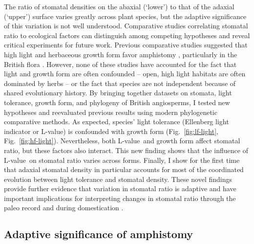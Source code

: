 \documentclass[12pt, oneside]{article}
\newcommand{\el}{L-value}
\begin{document}
The ratio of stomatal densities on the abaxial (`lower') to that of the adaxial (`upper') surface varies greatly across plant species, but the adaptive significance of this variation is not well understood. Comparative studies correlating stomatal ratio to ecological factors can distinguish among competing hypotheses and reveal critical experiments for future work. Previous comparative studies suggested that high light and herbaceous growth form favor amphistomy \citep{Mott_etal_1982, Jordan_etal_2014, Muir_2015, Bucher_etal_2017}, particularly in the British flora \citep{Salisbury_1927, Peat_Fitter_1994b}. However, none of these studies have accounted for the fact that light and growth form are often confounded -- open, high light habitats are often dominated by herbs -- or the fact that species are not independent because of shared evolutionary history. By bringing together datasets on stomata, light tolerance, growth form, and phylogeny of British angiosperms, I tested new hypotheses and reevaluated previous results using modern phylogenetic comparative methods. As expected, species' light tolerance (Ellenberg light indicator or \el) is confounded with growth form (Fig.~\ref{fig:lf-light}, Fig.~\ref{fig:hf-light}). Nevertheless, both \el~and growth form affect stomatal ratio, but these factors also interact. This new finding shows that the influence of \el~on stomatal ratio varies across forms. Finally, I show for the first time that adaxial stomatal density in particular accounts for most of the coordinated evolution between light tolerance and stomatal density. These novel findings provide further evidence that variation in stomatal ratio is adaptive and have important implications for interpreting changes in stomatal ratio through the paleo record \citep{Jordan_etal_2014} and during domestication \citep{Milla_etal_2013}.

\subsection*{Adaptive significance of amphistomy}
\end{document}
